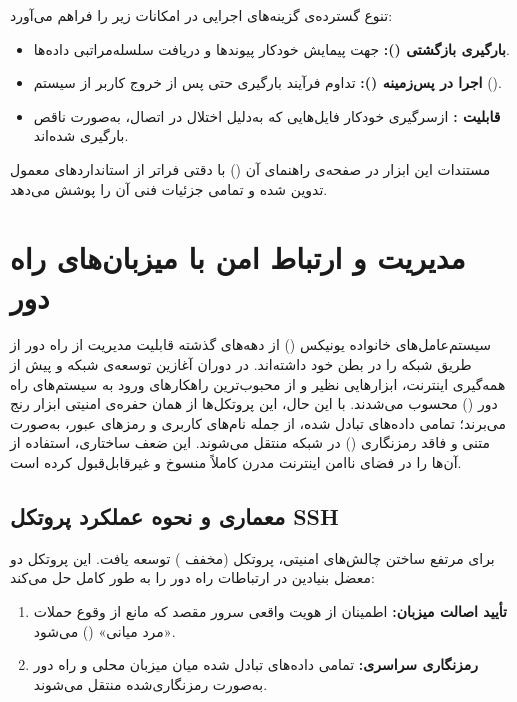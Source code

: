 تنوع گسترده‌ی گزینه‌های اجرایی در  امکانات زیر را فراهم می‌آورد:

\begin{itemize}
  \item \textbf{بارگیری بازگشتی ():} جهت پیمایش خودکار پیوندها و دریافت سلسله‌مراتبی داده‌ها.
  \item \textbf{اجرا در پس‌زمینه ():} تداوم فرآیند بارگیری حتی پس از خروج کاربر از سیستم ().
  \item \textbf{قابلیت :} ازسرگیری خودکار فایل‌هایی که به‌دلیل اختلال در اتصال، به‌صورت ناقص بارگیری شده‌اند.
\end{itemize}

مستندات این ابزار در صفحه‌ی راهنمای آن () با دقتی فراتر از استانداردهای معمول تدوین شده و تمامی جزئیات فنی آن را پوشش می‌دهد.

\section{مدیریت و ارتباط امن با میزبان‌های راه دور}

سیستم‌عامل‌های خانواده یونیکس () از دهه‌های گذشته قابلیت مدیریت از راه دور از طریق شبکه را در بطن خود داشته‌اند. در دوران آغازین توسعه‌ی شبکه و پیش از همه‌گیری اینترنت، ابزارهایی نظیر  و  از محبوب‌ترین راهکارهای ورود به سیستم‌های راه دور () محسوب می‌شدند. با این حال، این پروتکل‌ها از همان حفره‌ی امنیتی ابزار  رنج می‌برند؛ تمامی داده‌های تبادل شده، از جمله نام‌های کاربری و رمزهای عبور، به‌صورت متنی و فاقد رمزنگاری () در شبکه منتقل می‌شوند. این ضعف ساختاری، استفاده از آن‌ها را در فضای ناامن اینترنت مدرن کاملاً منسوخ و غیرقابل‌قبول کرده است.

\subsection{معماری و نحوه عملکرد پروتکل SSH}

برای مرتفع ساختن چالش‌های امنیتی، پروتکل  (مخفف ) توسعه یافت. این پروتکل دو معضل بنیادین در ارتباطات راه دور را به طور کامل حل می‌کند:

\begin{enumerate}
  \item \textbf{تأیید اصالت میزبان:} اطمینان از هویت واقعی سرور مقصد که مانع از وقوع حملات «مرد میانی» () می‌شود.
  \item \textbf{رمزنگاری سراسری:} تمامی داده‌های تبادل شده میان میزبان محلی و راه دور به‌صورت رمزنگاری‌شده منتقل می‌شوند.
\end{enumerate}

